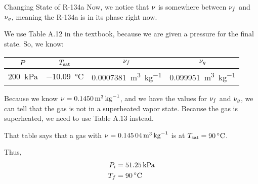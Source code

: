 \begin{example}[Problem 4.112]{Changing State of R-134a}
  Now, we notice that $\nu$ is somewhere between $\nu_{f}$ and $\nu_{g}$, meaning the R-134a is in its  phase right now.

  We use Table A.12 in the textbook, because we are given a pressure for the final state.
  So, we know:
  \begin{center}
    \begin{tabular}{cccc}
      \toprule
      $P$ & $T_{\mathrm{sat}}$ & $\nu_{f}$ & $\nu_{g}$ \\
      \midrule
      \SI{200}{\kilo\pascal} & \SI{-10.09}{\degreeCelsius} & \SI{0.0007381}{\meter\cubed\per\kilo\gram} & \SI{0.099951}{\meter\cubed\per\kilo\gram} \\
      \bottomrule
    \end{tabular}
  \end{center}

  Because we know $\nu = \SI{0.1450}{\meter\cubed\per\kilo\gram}$, and we have the values for $\nu_{f}$ and $\nu_{g}$, we can tell that the gas is not in a superheated vapor state.
  Because the gas is superheated, we need to use Table A.13 instead.

  That table says that a gas with $\nu = \SI{0.14504}{\meter\cubed\per\kilo\gram}$ is at $\SaturatedTemp = \SI{90}{\degreeCelsius}$.

  Thus,
  \begin{align*}
    \Pressure_{i} &= \SI{51.25}{\kilo\pascal} \\
    \Temp_{f} &= \SI{90}{\degreeCelsius}
  \end{align*}
\end{example}

